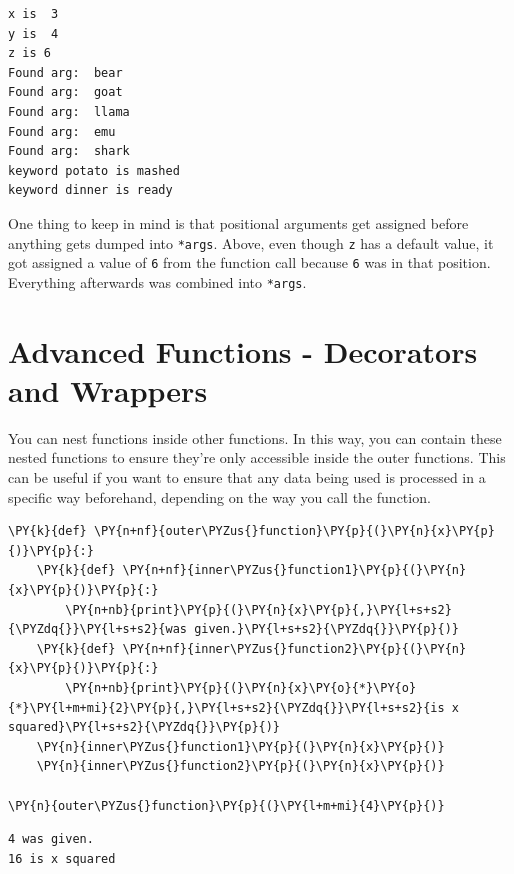     \begin{Verbatim}[commandchars=\\\{\}]
x is  3
y is  4
z is 6
Found arg:  bear
Found arg:  goat
Found arg:  llama
Found arg:  emu
Found arg:  shark
keyword potato is mashed
keyword dinner is ready
    \end{Verbatim}

    One thing to keep in mind is that positional arguments get assigned
before anything gets dumped into \texttt{*args}. Above, even though
\texttt{z} has a default value, it got assigned a value of \texttt{6}
from the function call because \texttt{6} was in that position.
Everything afterwards was combined into \texttt{*args}.
\section{Advanced Functions - Decorators and Wrappers}
You can nest functions inside other functions. In this way, you can
contain these nested functions to ensure they're only accessible inside
the outer functions. This can be useful if you want to ensure that any
data being used is processed in a specific way beforehand, depending on
the way you call the function.

    \begin{tcolorbox}[breakable, size=fbox, boxrule=1pt, pad at break*=1mm,colback=cellbackground, colframe=cellborder]
\begin{Verbatim}[commandchars=\\\{\}]
\PY{k}{def} \PY{n+nf}{outer\PYZus{}function}\PY{p}{(}\PY{n}{x}\PY{p}{)}\PY{p}{:}
    \PY{k}{def} \PY{n+nf}{inner\PYZus{}function1}\PY{p}{(}\PY{n}{x}\PY{p}{)}\PY{p}{:}
        \PY{n+nb}{print}\PY{p}{(}\PY{n}{x}\PY{p}{,}\PY{l+s+s2}{\PYZdq{}}\PY{l+s+s2}{was given.}\PY{l+s+s2}{\PYZdq{}}\PY{p}{)}
    \PY{k}{def} \PY{n+nf}{inner\PYZus{}function2}\PY{p}{(}\PY{n}{x}\PY{p}{)}\PY{p}{:}
        \PY{n+nb}{print}\PY{p}{(}\PY{n}{x}\PY{o}{*}\PY{o}{*}\PY{l+m+mi}{2}\PY{p}{,}\PY{l+s+s2}{\PYZdq{}}\PY{l+s+s2}{is x squared}\PY{l+s+s2}{\PYZdq{}}\PY{p}{)}
    \PY{n}{inner\PYZus{}function1}\PY{p}{(}\PY{n}{x}\PY{p}{)}
    \PY{n}{inner\PYZus{}function2}\PY{p}{(}\PY{n}{x}\PY{p}{)}

\PY{n}{outer\PYZus{}function}\PY{p}{(}\PY{l+m+mi}{4}\PY{p}{)}
\end{Verbatim}
\end{tcolorbox}

    \begin{Verbatim}[commandchars=\\\{\}]
4 was given.
16 is x squared
    \end{Verbatim}

